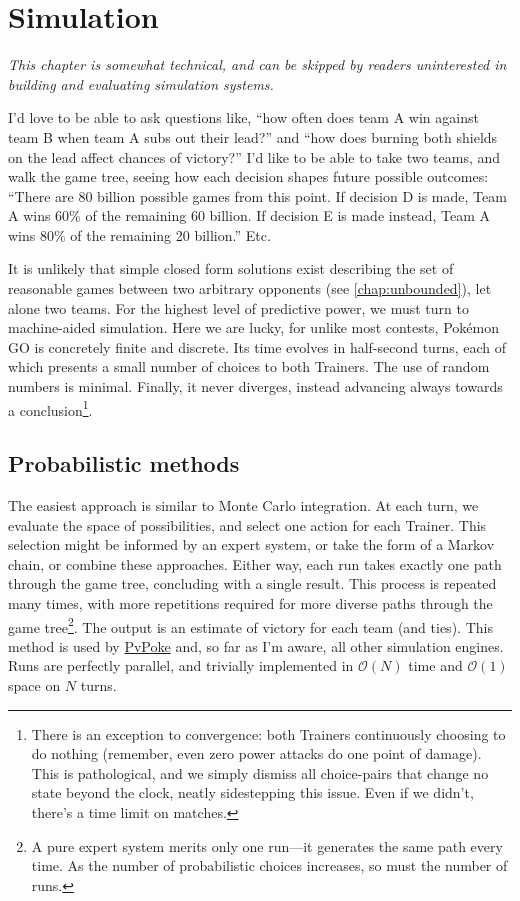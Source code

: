 \chapter{Simulation}
\label{chap:simul}
\textit{This chapter is somewhat technical, and can be skipped by readers
 uninterested in building and evaluating simulation systems.}
\vspace{1cm}

I'd love to be able to ask questions like, ``how often does team A win against
  team B when team A subs out their lead?''
  and ``how does burning both shields on the lead affect chances of victory?''
I'd like to be able to take two teams, and walk the game tree, seeing how
  each decision shapes future possible outcomes: ``There are 80 billion
  possible games from this point. If decision D is made, Team A
  wins 60\% of the remaining 60 billion. If decision E is made instead,
  Team A wins 80\% of the remaining 20 billion.'' Etc.

It is unlikely that simple closed form solutions exist describing
 the set of reasonable games between two arbitrary opponents (see \autoref{chap:unbounded}),
 let alone two teams.
For the highest level of predictive power, we must turn to machine-aided simulation.
Here we are lucky, for unlike most contests, Pokémon GO is concretely finite and discrete.
Its time evolves in half-second turns, each of which presents a small number of choices
  to both Trainers.
The use of random numbers is minimal.
Finally, it never diverges, instead advancing always towards a conclusion\footnote{There
  is an exception to convergence: both Trainers continuously choosing to do nothing (remember,
  even zero power attacks do one point of damage). This is pathological, and we
  simply dismiss all choice-pairs that change no state beyond the clock, neatly sidestepping this issue.
  Even if we didn't, there's a time limit on matches.}.

\section{Probabilistic methods}
\label{sec:probsimul}
The easiest approach is similar to Monte Carlo integration.
At each turn, we evaluate the space of possibilities, and select one action for each Trainer.
This selection might be informed by an expert system, or take the form of a Markov chain,
 or combine these approaches.
Either way, each run takes exactly one path through the game tree, concluding with a single result.
This process is repeated many times, with more repetitions required for more
 diverse paths through the game tree\footnote{A pure expert system merits only
 one run---it generates the same path every time. As the number of
 probabilistic choices increases, so must the number of runs.}.
The output is an estimate of victory for each team (and ties).
This method is used by \href{https://pvpoke.com}{PvPoke} and, so far as I'm aware,
 all other simulation engines.
Runs are perfectly parallel, and trivially implemented in $\mathcal{O}(N)$ time
 and $\mathcal{O}(1)$ space on $N$ turns.

